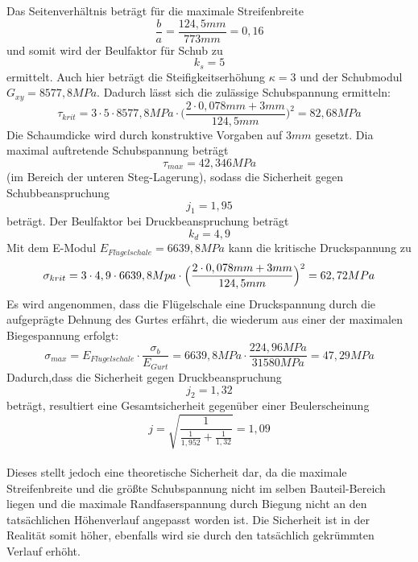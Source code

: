 \noindent Das Seitenverhältnis beträgt für die maximale Streifenbreite
\begin{equation}
	\frac{b}{a}=\frac{124,5 mm}{773 mm}=0,16
\end{equation}
und somit wird der Beulfaktor für Schub zu 
\begin{equation}
	k_{s}=5
\end{equation} 
ermittelt. Auch hier beträgt die Steifigkeitserhöhung $\kappa=3$ und der Schubmodul $G_{xy}=8577,8 MPa$. Dadurch lässt sich die zulässige Schubspannung ermitteln:
\begin{equation}
	\tau_{krit}=3\cdot 5\cdot 8577,8 MPa\cdot\biggl(\frac{2\cdot 0,078mm + 3mm}{124,5 mm}\biggr)^{2} =82,68 MPa
\end{equation}
Die Schaumdicke wird durch konstruktive Vorgaben auf $3 mm$ gesetzt. Dia maximal auftretende Schubspannung beträgt
\begin{equation}
	\tau_{max}=42,346 MPa
\end{equation}
(im Bereich der unteren Steg-Lagerung), sodass die Sicherheit gegen Schubbeanspruchung 
\begin{equation}
	j_{1}=1,95
\end{equation}
beträgt. Der Beulfaktor bei Druckbeanspruchung beträgt
\begin{equation}
	k_{d} = 4,9
\end{equation}
Mit dem E-Modul $E_{Fl\ddot{u}gelschale} = 6639,8 MPa$ kann die kritische Druckspannung zu
\begin{equation}
	\sigma_{krit} = 3\cdot 4,9\cdot 6639,8 Mpa\cdot\Bigl(\frac{2\cdot 0,078mm+3mm}{124,5mm}\Bigr)^{2}=62,72 MPa
\end{equation}
Es wird angenommen, dass die Flügelschale eine Druckspannung durch die aufgeprägte Dehnung des Gurtes erfährt, die wiederum aus einer der maximalen Biegespannung erfolgt:
\begin{equation}
	\sigma_{max}=E_{Fl\ddot{u}gelschale}\cdot\frac{\sigma_{b}}{E_{Gurt}}=6639,8 MPa\cdot\frac{224,96 MPa}{31580 MPa}=47,29 MPa
\end{equation}
Dadurch,dass die Sicherheit gegen Druckbeanspruchung
\begin{equation}
	j_{2}=1,32
\end{equation}
beträgt, resultiert eine Gesamtsicherheit gegenüber einer Beulerscheinung
\begin{equation}
	j=\sqrt{\frac{1}{\frac{1}{1,952}+\frac{1}{1,32}}}=1,09
\end{equation}\\

 \noindent Dieses stellt jedoch eine theoretische Sicherheit dar, da die maximale Streifenbreite und die größte Schubspannung nicht im selben Bauteil-Bereich liegen und die maximale Randfaserspannung durch Biegung nicht an den tatsächlichen Höhenverlauf angepasst worden ist. Die Sicherheit ist in der Realität somit höher, ebenfalls wird sie durch den tatsächlich gekrümmten Verlauf erhöht.